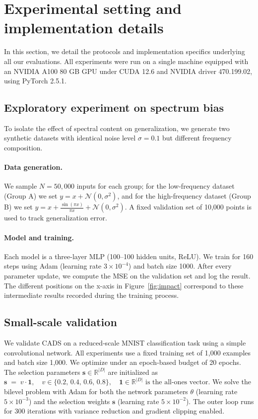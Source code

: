 \section{Experimental setting and implementation details}
\label{appendix:experimental_settings}
In this section, we detail the protocols and implementation specifics underlying all our evaluations. 
All experiments were run on a single machine equipped with an NVIDIA A100 80 GB GPU under CUDA 12.6 and NVIDIA driver 470.199.02, using PyTorch 2.5.1.

\subsection{Exploratory experiment on spectrum bias}
\label{appendix:exp-spectrum-bias}

To isolate the effect of spectral content on generalization, we generate two synthetic datasets with identical noise level \(\sigma=0.1\) but different frequency composition.

\paragraph{Data generation.} We sample \(N=50{,}000\) inputs for each group; for the low-frequency dataset (Group A) we set \(y = x + \mathcal{N}(0,\sigma^2)\), and for the high-frequency dataset (Group B) we set \(y = x + \frac{\sin(\pi x)}{\pi x} + \mathcal{N}(0,\sigma^2)\). A fixed validation set of 10,000 points is used to track generalization error.

\paragraph{Model and training.}  
Each model is a three-layer MLP (100–100 hidden units, ReLU). We train for 160 steps using Adam (learning rate \(3\times10^{-4}\)) and batch size 1000. After every parameter update, we compute the MSE on the validation set and log the result. The different positions on the x-axis in Figure~\ref{fig:impact} correspond to these intermediate results recorded during the training process.

\subsection{Small-scale validation}  
\label{appendix:small-scale-validation}   
We validate CADS on a reduced‐scale MNIST classification task using a simple convolutional network. All experiments use a fixed training set of 1,000 examples and batch size 1,000. We optimize under an epoch‐based budget of 20 epochs. The selection parameters $\bm{s}\in\mathbb{R}^{|D|}$ are initialized as  
\(
\bm{s} \;=\; v \cdot \bm{1}, 
\quad v \in \{0.2,\,0.4,\,0.6,\,0.8\},
\quad \bm{1}\in\mathbb{R}^{|D|} \text{ is the all-ones vector}.
\)
We solve the bilevel problem with Adam for both the network parameters $\theta$ (learning rate $5\times10^{-3}$) and the selection weights $\bm{s}$ (learning rate $5\times10^{-2}$). The outer loop runs for 300 iterations with variance reduction and gradient clipping enabled.

